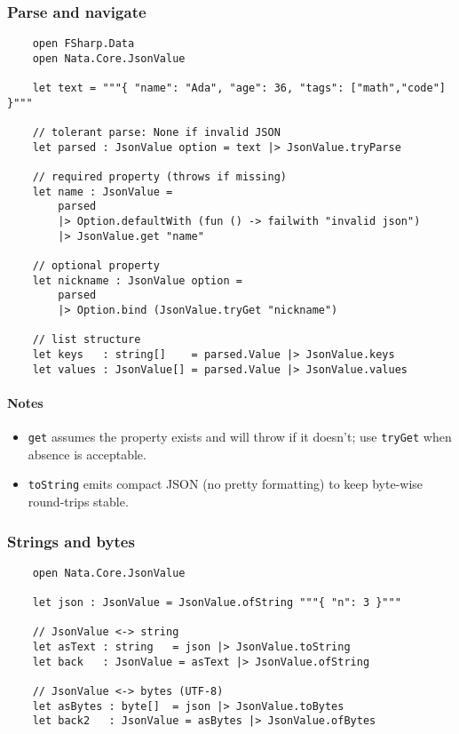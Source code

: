 \documentclass{article}
\begin{document}
\subsubsection{Parse and navigate}

\begin{verbatim}
    open FSharp.Data
    open Nata.Core.JsonValue

    let text = """{ "name": "Ada", "age": 36, "tags": ["math","code"] }"""

    // tolerant parse: None if invalid JSON
    let parsed : JsonValue option = text |> JsonValue.tryParse

    // required property (throws if missing)
    let name : JsonValue =
        parsed
        |> Option.defaultWith (fun () -> failwith "invalid json")
        |> JsonValue.get "name"

    // optional property
    let nickname : JsonValue option =
        parsed
        |> Option.bind (JsonValue.tryGet "nickname")

    // list structure
    let keys   : string[]    = parsed.Value |> JsonValue.keys
    let values : JsonValue[] = parsed.Value |> JsonValue.values
\end{verbatim}

\paragraph{Notes}
\begin{itemize}
  \item \texttt{get} assumes the property exists and will throw if it doesn't; use \texttt{tryGet} when absence is acceptable.
  \item \texttt{toString} emits compact JSON (no pretty formatting) to keep byte-wise round-trips stable.
\end{itemize}

\subsubsection{Strings and bytes}

\begin{verbatim}
    open Nata.Core.JsonValue

    let json : JsonValue = JsonValue.ofString """{ "n": 3 }"""

    // JsonValue <-> string
    let asText : string   = json |> JsonValue.toString
    let back   : JsonValue = asText |> JsonValue.ofString

    // JsonValue <-> bytes (UTF-8)
    let asBytes : byte[]  = json |> JsonValue.toBytes
    let back2   : JsonValue = asBytes |> JsonValue.ofBytes
\end{verbatim}
\end{document}
